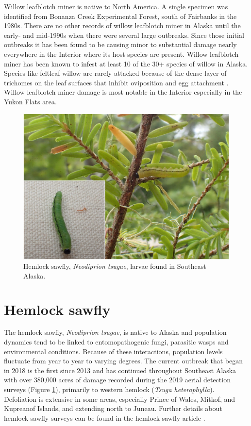 Willow leafblotch miner is native to North America. A single specimen was identified from Bonanza Creek Experimental Forest, south of Fairbanks in the 1980s. There are no other records of willow leafblotch miner in Alaska until the early- and mid-1990s when there were several large outbreaks. Since those initial outbreaks it has been found to be causing minor to substantial damage nearly everywhere in the Interior where its host species are present. Willow leafblotch miner has been known to infest at least 10 of the 30+ species of willow in Alaska. Species like feltleaf willow are rarely attacked because of the dense layer of trichomes on the leaf surfaces that inhibit oviposition and egg attachment \citep{Furnissetal2001}. Willow leafblotch miner damage is most notable in the Interior especially in the Yukon Flats area.

\begin{figure}[H]
\begin{center}
\vspace{2mm}
\includegraphics[width=\textwidth]{img/hemlock_sawfly.jpg}
\caption{Hemlock sawfly, \textit{Neodiprion tsugae}, larvae found in Southeast Alaska.}
\label{hemlock_sawfly}
\end{center}
\end{figure}  

\section{Hemlock sawfly}

The hemlock sawfly, \textit{Neodiprion tsugae}, is native to Alaska and population dynamics tend to be linked to entomopathogenic fungi, parasitic wasps and environmental conditions. Because of these interactions, population levels fluctuate from year to year to varying degrees. The current outbreak that began in 2018 is the first since 2013 and has continued throughout Southeast Alaska with over 380,000 acres of damage recorded during the 2019 aerial detection surveys (Figure \ref{hemlock_sawfly}), primarily to western hemlock (\textit{Tsuga heterophylla}). Defoliation is extensive in some areas, especially Prince of Wales, Mitkof, and Kupreanof Islands, and extending north to Juneau. Further details about hemlock sawfly surveys can be found in the hemlock sawfly article \citep{Graham2020}.  

